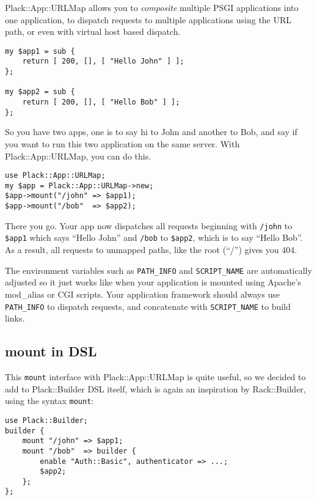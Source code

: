 Plack::App::URLMap allows you to \emph{composite} multiple PSGI
applications into one application, to dispatch requests to multiple
applications using the URL path, or even with virtual host based
dispatch.

\begin{lstlisting}
my $app1 = sub {
    return [ 200, [], [ "Hello John" ] ];
};

my $app2 = sub {
    return [ 200, [], [ "Hello Bob" ] ];
};
\end{lstlisting}

So you have two apps, one is to say hi to John and another to Bob, and
say if you want to run this two application on the same server. With
Plack::App::URLMap, you can do this.

\begin{lstlisting}
use Plack::App::URLMap;
my $app = Plack::App::URLMap->new;
$app->mount("/john" => $app1);
$app->mount("/bob"  => $app2);
\end{lstlisting}

There you go. Your app now dispatches all requests beginning with
\lstinline!/john! to \lstinline!$app1! which says ``Hello John'' and
\lstinline!/bob! to \lstinline!$app2!, which is to say ``Hello Bob''. As
a result, all requests to unmapped paths, like the root (``/'') gives
you 404.

The environment variables such as \lstinline!PATH_INFO! and
\lstinline!SCRIPT_NAME! are automatically adjusted so it just works like
when your application is mounted using Apache's mod\_alias or CGI
scripts. Your application framework should always use
\lstinline!PATH_INFO! to dispatch requests, and concatenate with
\lstinline!SCRIPT_NAME! to build links.

\subsection{mount in DSL}\label{mount-in-dsl}

This \lstinline!mount! interface with Plack::App::URLMap is quite
useful, so we decided to add to Plack::Builder DSL itself, which is
again an inspiration by Rack::Builder, using the syntax
\lstinline!mount!:

\begin{lstlisting}
use Plack::Builder;
builder {
    mount "/john" => $app1;
    mount "/bob"  => builder {
        enable "Auth::Basic", authenticator => ...;
        $app2;
    };
};
\end{lstlisting}


